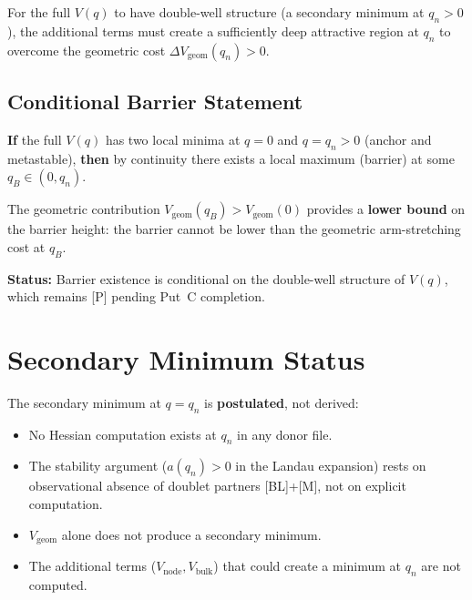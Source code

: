 For the full $V(q)$ to have double-well structure (a secondary minimum at
$q_n > 0$), the additional terms must create a sufficiently deep attractive
region at $q_n$ to overcome the geometric cost $\Delta V_{\mathrm{geom}}(q_n) > 0$.

\subsection{Conditional Barrier Statement}

\begin{resultbox}[title=Conditional Barrier Existence]
    \textbf{If} the full $V(q)$ has two local minima at $q = 0$ and
    $q = q_n > 0$ (anchor and metastable), \textbf{then} by continuity
    there exists a local maximum (barrier) at some $q_B \in (0, q_n)$.

    The geometric contribution $V_{\mathrm{geom}}(q_B) > V_{\mathrm{geom}}(0)$
    provides a \textbf{lower bound} on the barrier height: the barrier cannot
    be lower than the geometric arm-stretching cost at $q_B$.

    \textbf{Status:} Barrier existence is conditional on the double-well
    structure of $V(q)$, which remains [P] pending Put~C completion. \tagDc
\end{resultbox}

\section{Secondary Minimum Status}
\label{sec:vq:minimum}

The secondary minimum at $q = q_n$ is \textbf{postulated}, not derived:

\begin{itemize}
    \item No Hessian computation exists at $q_n$ in any donor file.
    \item The stability argument ($a(q_n) > 0$ in the Landau expansion)
          rests on observational absence of doublet partners [BL]+[M],
          not on explicit computation.
    \item $V_{\mathrm{geom}}$ alone does not produce a secondary minimum.
    \item The additional terms ($V_{\mathrm{node}}, V_{\mathrm{bulk}}$)
          that could create a minimum at $q_n$ are not computed.
\end{itemize}

